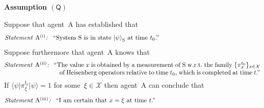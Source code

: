 \documentclass{article}
\theoremstyle{mystyle}
\theoremstyle{definition}
\newcommand*{\cX}{\mathcal{X}}
\newcommand*{\ket}[1]{{| #1 \rangle}}
\newcommand*{\bra}[1]{{\langle #1 |}}
\newcommand*{\Agent}{\mathrm{A}}
\newcommand*{\System}{\mathrm{S}}
\newcommand*{\QT}{\mathsf{(Q)}}
\newcommand*{\asn}[1]{``#1''}
\newcommand*{\sT}[1]{{\text{\emph{Statement} $#1$\emph{:} }}}
\newcommand*{\sTM}[1]{\begin{minipage}{14cm} \hangindent=8.6em  #1 \end{minipage}}
\begin{document}
 \newcommand{\nsb}{\vspace{-1.4ex}}
 
\begin{emphbox}

  \noindent \textbf{Assumption $\QT$}   
  
   \smallskip
 
\noindent 
Suppose that agent~$\Agent$ has established that \nsb
\begin{align*}
\sTM{\sT{\Agent^{\mathrm{(i)}}} \asn{System $\System$ is in state $\ket{\psi}_{\System}$ at time~$t_0$.}} 
\end{align*}
 Suppose furthermore that agent~$\Agent$ knows that \nsb
\begin{align*}
\sTM{\sT{{\Agent}^{\mathrm{(ii)}}}  \asn{The value $x$ is obtained by a measurement of $\System$  w.r.t.\ the family $\{\pi^{t_0}_x\}_{x \in \cX}$ of Heisenberg operators relative to time $t_0$, which is completed at time~$t$.}}
\end{align*} 
If $\bra{\psi} \pi_{\xi}^{t_0} \ket{\psi} = 1$ for some~$\xi \in \cX$ then agent~$\Agent$ can conclude that \nsb
\begin{align*}
\sTM{\sT{{\Agent}^{\mathrm{(iii)}}} \asn{I am certain that $x=\xi$ at time $t$.}}
\end{align*} \vspace{-4ex}

\end{emphbox}
\end{document}
